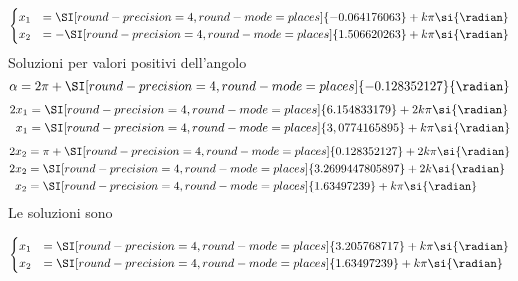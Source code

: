 \begin{exercise}
 \[\begin{cases}
 x_1&=\SI[round-precision=\lungarrotandamento,round-mode=places]{-0.064176063}+k\pi \si{\radian}\\
 x_2&=-\SI[round-precision=\lungarrotandamento,round-mode=places]{1.506620263}+k\pi \si{\radian}\\
 \end{cases}\]
 Soluzioni per valori positivi dell'angolo
 \[\alpha=2\pi+ \SI[round-precision=\lungarrotandamento,round-mode=places]{-0.128352127}{\radian}\]
 \begin{align*}
 2x_1&=\SI[round-precision=\lungarrotandamento,round-mode=places]{6.154833179}+2k\pi \si{\radian}\\
 x_1&=\SI[round-precision=\lungarrotandamento,round-mode=places]{3,0774165895}+k\pi \si{\radian}\\
 \end{align*}
 \begin{align*}
 2x_2&=\pi+\SI[round-precision=\lungarrotandamento,round-mode=places]{0.128352127}+2k\pi \si{\radian}\\
 2x_2&=\SI[round-precision=\lungarrotandamento,round-mode=places]{3.2699447805897}+2k \si{\radian}\\
 x_2&=\SI[round-precision=\lungarrotandamento,round-mode=places]{1.63497239}+k\pi \si{\radian}\\
 \end{align*}
 Le soluzioni sono
 
 \[\begin{cases}
 x_1&=\SI[round-precision=\lungarrotandamento,round-mode=places]{3.205768717}+k\pi \si{\radian}\\
 x_2&=\SI[round-precision=\lungarrotandamento,round-mode=places]{1.63497239}+k\pi \si{\radian}\\
 \end{cases}\]
 
 \end{exercise}
 
